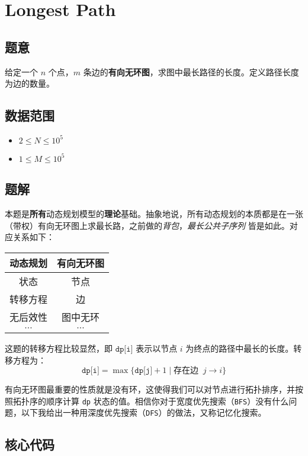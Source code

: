 \section{Longest Path}
\subsection*{题意}
给定一个 $n$ 个点，$m$ 条边的\textbf{有向无环图}，求图中最长路径的长度。定义路径长度为边的数量。
\subsection*{数据范围}
\begin{itemize}
\item $2 \leq N \leq 10^5$
\item $1 \leq M \leq 10^5$

\end{itemize}

\subsection*{题解}

本题是\textbf{所有}动态规划模型的\textbf{理论}基础。抽象地说，所有动态规划的本质都是在一张（带权）有向无环图上求最长路，之前做的\textit{背包}，\textit{最长公共子序列} 皆是如此。对应关系如下：
\begin{center}
\begin{tabular}{ |c|c| } 
 \hline
 \textbf{动态规划} & \textbf{有向无环图} \\
 \hline
 状态 & 节点\\ 
 \hline
 转移方程 & 边\\ 
 \hline
 无后效性 & 图中无环\\ 
 \hline
 $\cdots$ & $\cdots$\\
 \hline
\end{tabular}
\end{center}

这题的转移方程比较显然，即 ${\texttt{dp[i]}}$ 表示以节点 $i$ 为终点的路径中最长的长度。转移方程为：
$$
{\texttt{dp[i]}} = \max\{{\texttt{dp[j]}} + 1 \mid \text{存在边 }\ j\rightarrow i\}
$$

有向无环图最重要的性质就是没有环，这使得我们可以对节点进行拓扑排序，并按照拓扑序的顺序计算 {\texttt{dp}} 状态的值。相信你对于宽度优先搜索（{\texttt{BFS}}）没有什么问题，以下我给出一种用深度优先搜索（{\texttt{DFS}}）的做法，又称记忆化搜索。

\subsection*{核心代码}
\inputminted[linenos,autogobble]{cpp}{../Code/G.cpp}
\newpage